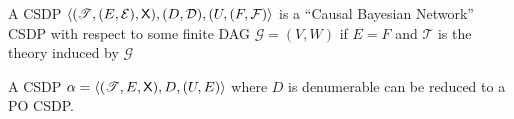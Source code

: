 \begin{definition}
A CSDP $\langle (\mathscr{T},(E,\mathcal{E}),\mathsf{X}),(D,\mathcal{D}), (U,(F,\mathcal{F})\rangle$ is a ``Causal Bayesian Network'' CSDP with respect to some finite DAG $\mathcal{G}=(V,W)$ if $E=F$ and $\mathscr{T}$ is the theory induced by $\mathcal{G}$ 



\end{definition}

\begin{theorem}[Reduction to PO]\label{th:red_to_PO}
A CSDP $\alpha=\langle (\mathscr{T},E,\mathsf{X}),D,(U,E) \rangle$ where $D$ is denumerable can be reduced to a PO CSDP.
\end{theorem}

